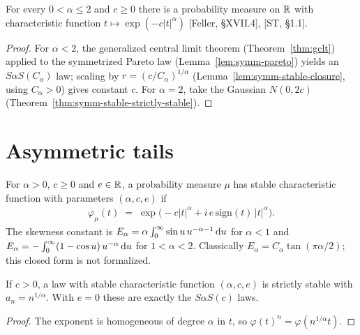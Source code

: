 \begin{theorem}
  \label{thm:exists-symm-stable}
  \leanok
  For every $0 < \alpha \le 2$ and $c \ge 0$ there is a probability measure on $\mathbb{R}$ with
  characteristic function $t \mapsto \exp(-c |t|^\alpha)$ [Feller, \S XVII.4], [ST, \S1.1].
\end{theorem}
\begin{proof}
  \leanok
  For $\alpha < 2$, the generalized central limit theorem (Theorem~\ref{thm:gclt}) applied to the
  symmetrized Pareto law (Lemma~\ref{lem:symm-pareto}) yields an $S\alpha S(C_\alpha)$ law;
  scaling by $r = (c/C_\alpha)^{1/\alpha}$ (Lemma~\ref{lem:symm-stable-closure}, using
  $C_\alpha > 0$) gives constant $c$. For $\alpha = 2$, take the Gaussian $N(0, 2c)$
  (Theorem~\ref{thm:symm-stable-strictly-stable}).
\end{proof}

\section{Asymmetric tails}

\begin{definition}
  \label{def:has-stable-charfun}
  \leanok
  For $\alpha > 0$, $c \ge 0$ and $e \in \mathbb{R}$, a probability measure $\mu$ has stable
  characteristic function with parameters $(\alpha, c, e)$ if
  \begin{align*}
    \varphi_\mu(t) \; = \; \exp\big( -c |t|^\alpha + i \, e \, \mathrm{sign}(t) \, |t|^\alpha \big) .
  \end{align*}
  The skewness constant is $E_\alpha = \alpha \int_0^\infty \sin u \, u^{-\alpha-1} \, \mathrm{d} u$ for
  $\alpha < 1$ and $E_\alpha = -\int_0^\infty (1 - \cos u) \, u^{-\alpha} \, \mathrm{d} u$ for
  $1 < \alpha < 2$. Classically $E_\alpha = C_\alpha \tan(\pi\alpha/2)$; this closed form is not
  formalized.
\end{definition}

\begin{theorem}
  \label{thm:has-stable-charfun-stable}
  \leanok
  If $c > 0$, a law with stable characteristic function $(\alpha, c, e)$ is strictly stable with
  $a_n = n^{1/\alpha}$. With $e = 0$ these are exactly the $S\alpha S(c)$ laws.
\end{theorem}
\begin{proof}
  \leanok
  The exponent is homogeneous of degree $\alpha$ in $t$, so $\varphi(t)^n = \varphi(n^{1/\alpha} t)$.
\end{proof}

